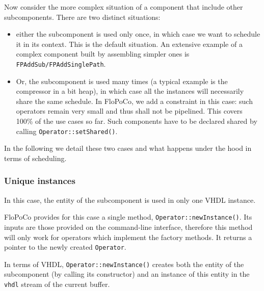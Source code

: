 \documentclass{article}
\begin{document}
Now consider the more complex situation of a component that include other subcomponents.
There are two distinct situations:
\begin{itemize}
\item either the subcomponent is used only once, in which case we want to schedule it in its context.
  This is the default situation.
  An extensive example of a complex component built by assembling simpler ones is \texttt{FPAddSub/FPAddSinglePath}.
  
\item Or, the subcomponent is used many times (a typical example is the compressor in a bit heap), in which case all the instances will necessarily share the same schedule.
  In FloPoCo, we add a constraint in this case: such operators remain very small and thus shall not be pipelined.
  This covers 100\% of the use cases so far.
  Such components have to be declared shared by calling \texttt{Operator::setShared()}.
\end{itemize}

In the following we detail these two cases and what happens under the hood in terms of scheduling.


\subsubsection{Unique instances}
In this case, the entity of the subcomponent is used in only one VHDL instance.

FloPoCo provides for this case a single method, \verb!Operator::newInstance()!.
Its inputs are those provided on the command-line interface, therefore this method will only work for operators which implement the factory methods.
It returns a pointer to the newly created \texttt{Operator}.

In terms of VHDL, \verb!Operator::newInstance()! creates both the entity of the subcomponent (by calling its constructor) and an instance of this entity in the \texttt{vhdl} stream of the current buffer.
\end{document}
